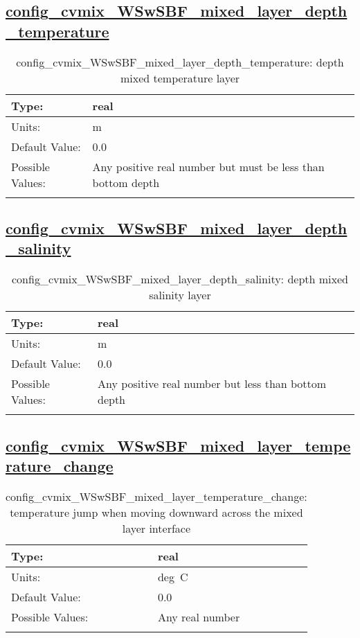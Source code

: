 \subsection[config\_cvmix\_WSwSBF\_mixed\_layer\_depth\_temperature]{\hyperref[sec:nm_tab_cvmix_WSwSBF]{config\_cvmix\_WSwSBF\_mixed\_layer\_depth\_temperature}}
\label{subsec:nm_sec_config_cvmix_WSwSBF_mixed_layer_depth_temperature}
\begin{center}
\begin{longtable}{| p{2.0in} || p{4.0in} |}
    \hline
    Type: & real \\
    \hline
    Units: & \si{m} \\
    \hline
    Default Value: & 0.0 \\
    \hline
    Possible Values: & Any positive real number but must be less than bottom depth \\
    \hline
    \caption{config\_cvmix\_WSwSBF\_mixed\_layer\_depth\_temperature: depth mixed temperature layer}
\end{longtable}
\end{center}
\subsection[config\_cvmix\_WSwSBF\_mixed\_layer\_depth\_salinity]{\hyperref[sec:nm_tab_cvmix_WSwSBF]{config\_cvmix\_WSwSBF\_mixed\_layer\_depth\_salinity}}
\label{subsec:nm_sec_config_cvmix_WSwSBF_mixed_layer_depth_salinity}
\begin{center}
\begin{longtable}{| p{2.0in} || p{4.0in} |}
    \hline
    Type: & real \\
    \hline
    Units: & \si{m} \\
    \hline
    Default Value: & 0.0 \\
    \hline
    Possible Values: & Any positive real number but less than bottom depth \\
    \hline
    \caption{config\_cvmix\_WSwSBF\_mixed\_layer\_depth\_salinity: depth mixed salinity layer}
\end{longtable}
\end{center}
\subsection[config\_cvmix\_WSwSBF\_mixed\_layer\_temperature\_change]{\hyperref[sec:nm_tab_cvmix_WSwSBF]{config\_cvmix\_WSwSBF\_mixed\_layer\_temperature\_change}}
\label{subsec:nm_sec_config_cvmix_WSwSBF_mixed_layer_temperature_change}
\begin{center}
\begin{longtable}{| p{2.0in} || p{4.0in} |}
    \hline
    Type: & real \\
    \hline
    Units: & \si{deg.C} \\
    \hline
    Default Value: & 0.0 \\
    \hline
    Possible Values: & Any real number \\
    \hline
    \caption{config\_cvmix\_WSwSBF\_mixed\_layer\_temperature\_change: temperature jump when moving downward across the mixed layer interface}
\end{longtable}
\end{center}
